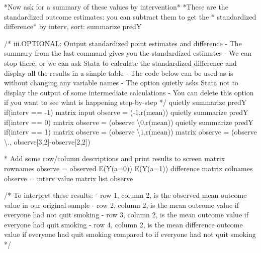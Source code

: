 \documentclass[
  10pt,
  a4paper,
]{book}
\newenvironment{Shaded}{\begin{snugshade}}{\end{snugshade}}
\newcommand{\CommentTok}[1]{\textcolor[rgb]{0.37,0.37,0.37}{#1}}
\newcommand{\FunctionTok}[1]{\textcolor[rgb]{0.28,0.35,0.67}{#1}}
\newcommand{\KeywordTok}[1]{\textcolor[rgb]{0.00,0.46,0.62}{#1}}
\newcommand{\NormalTok}[1]{\textcolor[rgb]{0.00,0.46,0.62}{#1}}
\newcommand{\OtherTok}[1]{\textcolor[rgb]{0.00,0.46,0.62}{#1}}
\begin{document}
\begin{Shaded}
\begin{Highlighting}[]
\NormalTok{*Now ask }\KeywordTok{for}\NormalTok{ a summary }\KeywordTok{of}\NormalTok{ these }\KeywordTok{values} \KeywordTok{by}\NormalTok{ intervention*}
\NormalTok{*These are the standardized outcome }\KeywordTok{estimates}\NormalTok{: you can subtract them to }\FunctionTok{get}\NormalTok{ the}
\NormalTok{* standardized difference*}
\KeywordTok{by}\NormalTok{ interv, }\KeywordTok{sort}\NormalTok{: }\KeywordTok{summarize}\NormalTok{ predY}

\CommentTok{/* iii.OPTIONAL: Output standardized point estimates and difference}
\CommentTok{{-} The summary from the last command gives you the }
\CommentTok{standardized estimates}
\CommentTok{{-} We can stop there, or we can ask Stata to calculate the }
\CommentTok{standardized difference and display all the results }
\CommentTok{in a simple table}
\CommentTok{{-} The code below can be used as{-}is without changing any}
\CommentTok{variable names}
\CommentTok{{-} The option \textasciigrave{}quietly\textasciigrave{} asks Stata not to display the output of }
\CommentTok{some intermediate calculations}
\CommentTok{{-} You can delete this option if you want to see what is }
\CommentTok{happening step{-}by{-}step */}
\KeywordTok{quietly} \KeywordTok{summarize}\NormalTok{ predY }\KeywordTok{if}\NormalTok{(interv == {-}1)}
\FunctionTok{matrix}\NormalTok{ input observe = ({-}1,}\OtherTok{\textasciigrave{}r(mean)\textquotesingle{}}\NormalTok{)}
\KeywordTok{quietly} \KeywordTok{summarize}\NormalTok{ predY }\KeywordTok{if}\NormalTok{(interv == 0)}
\FunctionTok{matrix}\NormalTok{ observe = (observe \textbackslash{}0,}\OtherTok{\textasciigrave{}r(mean)\textquotesingle{}}\NormalTok{)}
\KeywordTok{quietly} \KeywordTok{summarize}\NormalTok{ predY }\KeywordTok{if}\NormalTok{(interv == 1)}
\FunctionTok{matrix}\NormalTok{ observe = (observe \textbackslash{}1,}\OtherTok{\textasciigrave{}r(mean)\textquotesingle{}}\NormalTok{)}
\FunctionTok{matrix}\NormalTok{ observe = (observe \textbackslash{}., observe[3,2]{-}observe[2,2]) }

\NormalTok{* Add some }\OtherTok{row}\NormalTok{/column descriptions and }\KeywordTok{print}\NormalTok{ results to screen}
\FunctionTok{matrix} \OtherTok{rownames}\NormalTok{ observe = observed E(Y(a=0)) E(Y(a=1)) difference}
\FunctionTok{matrix} \OtherTok{colnames}\NormalTok{ observe = interv }\OtherTok{value}
\FunctionTok{matrix} \OtherTok{list}\NormalTok{ observe }

\CommentTok{/* To interpret these results:}
\CommentTok{{-} row 1, column 2, is the observed mean outcome value }
\CommentTok{in our original sample}
\CommentTok{{-} row 2, column 2, is the mean outcome value }
\CommentTok{if everyone had not quit smoking}
\CommentTok{{-} row 3, column 2, is the mean outcome value }
\CommentTok{if everyone had quit smoking}
\CommentTok{{-} row 4, column 2, is the mean difference outcome value }
\CommentTok{if everyone had quit smoking compared to if everyone }
\CommentTok{had not quit smoking */}


\end{Highlighting}
\end{Shaded}
\end{document}
